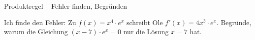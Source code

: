 \begin{aufgabe}{Produktregel – Fehler finden, Begründen}
\begin{teile}
\teil Ich finde den Fehler: Zu $f(x) = x^4 \cdot e^x$ schreibt Ole $f'(x) = 4x^3 \cdot e^x$.
\teil Begründe, warum die Gleichung $(x - 7) \cdot e^x = 0$ nur die Lösung $x = 7$ hat.
\end{teile}
\end{aufgabe}
